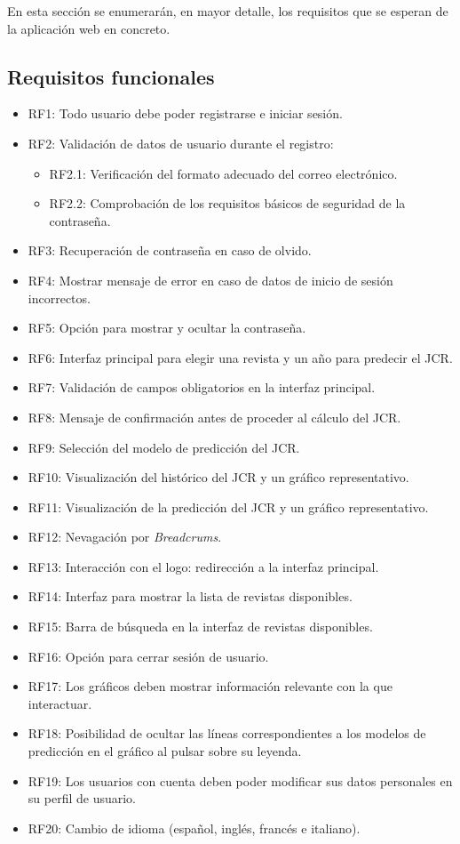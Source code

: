 En esta sección se enumerarán, en mayor detalle, los requisitos que se esperan de la aplicación web en concreto.

\subsection{Requisitos funcionales}

\begin{itemize}
    \item RF1: Todo usuario debe poder registrarse e iniciar sesión.
    \item RF2: Validación de datos de usuario durante el registro:
    \begin{itemize}
        \item RF2.1: Verificación del formato adecuado del correo electrónico.
        \item RF2.2: Comprobación de los requisitos básicos de seguridad de la contraseña.
    \end{itemize}
    \item RF3: Recuperación de contraseña en caso de olvido.
    \item RF4: Mostrar mensaje de error en caso de datos de inicio de sesión incorrectos.
    \item RF5: Opción para mostrar y ocultar la contraseña.
    \item RF6: Interfaz principal para elegir una revista y un año para predecir el JCR.
    \item RF7: Validación de campos obligatorios en la interfaz principal.
    \item RF8: Mensaje de confirmación antes de proceder al cálculo del JCR.
    \item RF9: Selección del modelo de predicción del JCR.
    \item RF10: Visualización del histórico del JCR y un gráfico representativo.
    \item RF11: Visualización de la predicción del JCR y un gráfico representativo.
    \item RF12: Nevagación por \textit{Breadcrums}.
    \item RF13: Interacción con el logo: redirección a la interfaz principal.
    \item RF14: Interfaz para mostrar la lista de revistas disponibles.
    \item RF15: Barra de búsqueda en la interfaz de revistas disponibles.
    \item RF16: Opción para cerrar sesión de usuario.
    \item RF17: Los gráficos deben mostrar información relevante con la que interactuar.
    \item RF18: Posibilidad de ocultar las líneas correspondientes a los modelos de predicción en el gráfico al pulsar sobre su leyenda.
    \item RF19: Los usuarios con cuenta deben poder modificar sus datos personales en su perfil de usuario.
    \item RF20: Cambio de idioma (español, inglés, francés e italiano).
\end{itemize}

